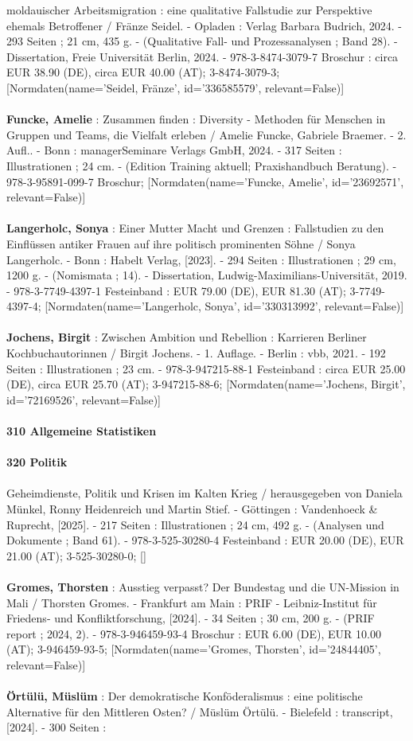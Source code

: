 \documentclass{article}
\begin{document}
\begin{multicols}{3}
moldauischer Arbeitsmigration : eine qualitative Fallstudie zur Perspektive ehemals Betroffener / Fränze Seidel. - Opladen : Verlag Barbara Budrich, 2024. - 293 Seiten ; 21 cm, 435 g. - (Qualitative Fall- und Prozessanalysen ; Band 28). - Dissertation, Freie Universität Berlin, 2024. - 978-3-8474-3079-7 Broschur : circa EUR 38.90 (DE), circa EUR 40.00 (AT); 3-8474-3079-3; [Normdaten(name='Seidel, Fränze', id='336585579', relevant=False)]\\\\\textbf{Funcke, Amelie} : Zusammen finden : Diversity - Methoden für Menschen in Gruppen und Teams, die Vielfalt erleben / Amelie Funcke, Gabriele Braemer. - 2. Aufl.. - Bonn : managerSeminare Verlags GmbH, 2024. - 317 Seiten : Illustrationen ; 24 cm. - (Edition Training aktuell; Praxishandbuch Beratung). - 978-3-95891-099-7 Broschur; [Normdaten(name='Funcke, Amelie', id='23692571', relevant=False)]\\\\\textbf{Langerholc, Sonya} : Einer Mutter Macht und Grenzen : Fallstudien zu den Einflüssen antiker Frauen auf ihre politisch prominenten Söhne / Sonya Langerholc. - Bonn : Habelt Verlag, [2023]. - 294 Seiten : Illustrationen ; 29 cm, 1200 g. - (Nomismata ; 14). - Dissertation, Ludwig-Maximilians-Universität, 2019. - 978-3-7749-4397-1 Festeinband : EUR 79.00 (DE), EUR 81.30 (AT); 3-7749-4397-4; [Normdaten(name='Langerholc, Sonya', id='330313992', relevant=False)]\\\\\textbf{Jochens, Birgit} : Zwischen Ambition und Rebellion : Karrieren Berliner Kochbuchautorinnen / Birgit Jochens. - 1. Auflage. - Berlin : vbb, 2021. - 192 Seiten : Illustrationen ; 23 cm. - 978-3-947215-88-1 Festeinband : circa EUR 25.00 (DE), circa EUR 25.70 (AT); 3-947215-88-6; [Normdaten(name='Jochens, Birgit', id='72169526', relevant=False)]\\\\\textbf{310 Allgemeine Statistiken}\\\\\textbf{320 Politik}\\\\Geheimdienste, Politik und Krisen im Kalten Krieg / herausgegeben von Daniela Münkel, Ronny Heidenreich und Martin Stief. - Göttingen : Vandenhoeck \& Ruprecht, [2025]. - 217 Seiten : Illustrationen ; 24 cm, 492 g. - (Analysen und Dokumente ; Band 61). - 978-3-525-30280-4 Festeinband : EUR 20.00 (DE), EUR 21.00 (AT); 3-525-30280-0; []\\\\\textbf{Gromes, Thorsten} : Ausstieg verpasst? Der Bundestag und die UN-Mission in Mali / Thorsten Gromes. - Frankfurt am Main : PRIF - Leibniz-Institut für Friedens- und Konfliktforschung, [2024]. - 34 Seiten ; 30 cm, 200 g. - (PRIF report ; 2024, 2). - 978-3-946459-93-4 Broschur : EUR 6.00 (DE), EUR 10.00 (AT); 3-946459-93-5; [Normdaten(name='Gromes, Thorsten', id='24844405', relevant=False)]\\\\\textbf{Örtülü, Müslüm} : Der demokratische Konföderalismus : eine politische Alternative für den Mittleren Osten? / Müslüm Örtülü. - Bielefeld : transcript, [2024]. - 300 Seiten : 
\end{multicols}
\end{document}

